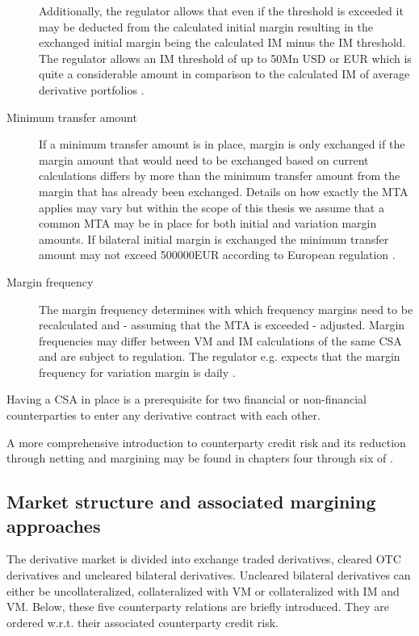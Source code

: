 \documentclass[../Thesis_AHoecherl.tex]{subfiles}
\begin{document}
\begin{description}
    Additionally, the regulator allows that even if the threshold is exceeded it may be deducted from the calculated initial margin resulting in the exchanged initial margin being the calculated \gls{IM} minus the \gls{IM} threshold.
    The regulator allows an \gls{IM} threshold of up to 50Mn USD or EUR \cite[Requirement 2.2]{BCBS_MarginRequirements} which is quite a considerable amount in comparison to the calculated \gls{IM} of average derivative portfolios \cite{ISDAMarginSurvey}.
    \item[Minimum transfer amount]
    If a minimum transfer amount is in place, margin is only exchanged if the margin amount that would need to be exchanged based on current calculations differs by more than the minimum transfer amount from the margin that has already been exchanged.
    Details on how exactly the \gls{MTA} applies may vary but within the scope of this thesis we assume that a common \gls{MTA} may be in place for both initial and variation margin amounts. If bilateral initial margin is exchanged the minimum transfer amount may not exceed 500000EUR according to European regulation \cite[Requirement 2.3]{BCBS_MarginRequirements}.  
    \item[Margin frequency]
    The margin frequency determines with which frequency margins need to be recalculated and - assuming that the \gls{MTA} is exceeded - adjusted. Margin frequencies may differ between \gls{VM} and \gls{IM} calculations of the same \gls{CSA} and are subject to regulation. The regulator e.g. expects that the margin frequency for variation margin is daily \cite[Requirement 3.14]{BCBS_MarginRequirements}.
\end{description}

Having a \gls{CSA} in place is a prerequisite for two financial or non-financial counterparties to enter any derivative contract with each other.

A more comprehensive introduction to counterparty credit risk and its reduction through netting and margining may be found in chapters four through six of \cite{gregory2015xva}.

\subsection{Market structure and associated margining approaches}\label{sec:Market strucutre and associated margining approaches}

The derivative market is divided into exchange traded derivatives, cleared \gls{OTC} derivatives and uncleared bilateral derivatives. Uncleared bilateral derivatives can either be uncollateralized, collateralized with \gls{VM} or collateralized with \gls{IM} and \gls{VM}. Below, these five counterparty relations are briefly introduced. They are ordered w.r.t. their associated counterparty credit risk.
\end{document}
